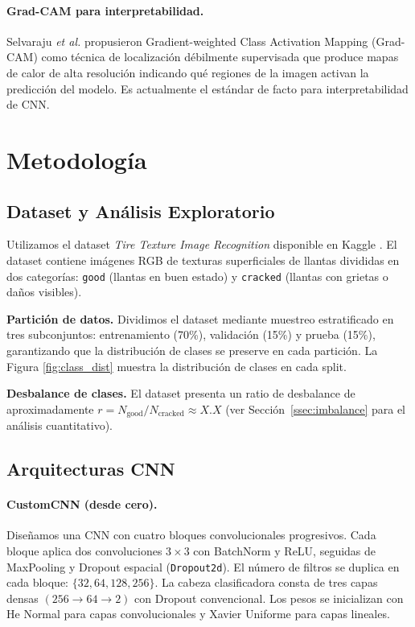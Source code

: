 \documentclass{article}
\begin{document}
\paragraph{Grad-CAM para interpretabilidad.}
Selvaraju \emph{et al.} \cite{selvaraju2017gradcam} propusieron Gradient-weighted 
Class Activation Mapping (Grad-CAM) como técnica de localización débilmente supervisada 
que produce mapas de calor de alta resolución indicando qué regiones de la imagen 
activan la predicción del modelo. Es actualmente el estándar de facto para 
interpretabilidad de CNN.

\section{Metodología}
\label{sec:methodology}

\subsection{Dataset y Análisis Exploratorio}
\label{ssec:dataset}

Utilizamos el dataset \emph{Tire Texture Image Recognition} disponible en Kaggle 
\cite{kaggle_tire}. El dataset contiene imágenes RGB de texturas superficiales de 
llantas divididas en dos categorías: \texttt{good} (llantas en buen estado) y 
\texttt{cracked} (llantas con grietas o daños visibles).

\textbf{Partición de datos.} Dividimos el dataset mediante muestreo estratificado 
en tres subconjuntos: entrenamiento (70\%), validación (15\%) y prueba (15\%), 
garantizando que la distribución de clases se preserve en cada partición. La Figura 
\ref{fig:class_dist} muestra la distribución de clases en cada split.

\textbf{Desbalance de clases.} El dataset presenta un ratio de desbalance de 
aproximadamente $r = N_{\text{good}} / N_{\text{cracked}} \approx X.X$ (ver 
Sección~\ref{ssec:imbalance} para el análisis cuantitativo).

\subsection{Arquitecturas CNN}
\label{ssec:architectures}

\paragraph{CustomCNN (desde cero).}
Diseñamos una CNN con cuatro bloques convolucionales progresivos. Cada bloque aplica 
dos convoluciones $3\times3$ con BatchNorm y ReLU, seguidas de MaxPooling y 
Dropout espacial (\texttt{Dropout2d}). El número de filtros se duplica en cada 
bloque: $\{32, 64, 128, 256\}$. La cabeza clasificadora consta de tres capas densas 
$(256 \to 64 \to 2)$ con Dropout convencional. Los pesos se inicializan con He 
Normal para capas convolucionales y Xavier Uniforme para capas lineales.
\end{document}
